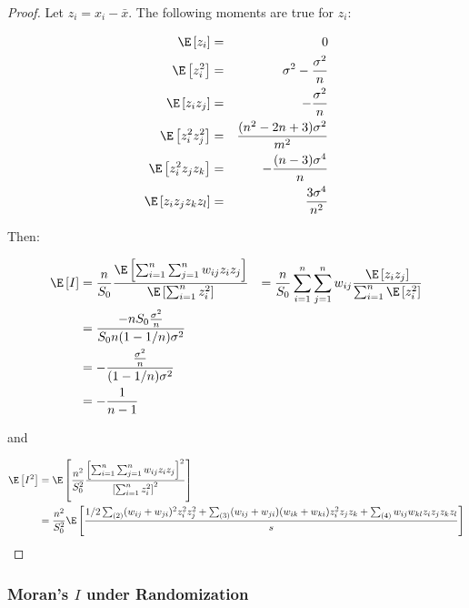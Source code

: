 \documentclass[english,12pt]{book}\usepackage[]{graphicx}\usepackage[]{xcolor}
\begin{document}
\begin{proof}
Let $z_i=x_i - \bar{x}$. The following moments are true for $z_i$:

\begin{eqnarray*}
\E\left[z_i\right]   & = & 0 \\
\E\left[z_i^2\right] & = & \sigma^2 - \frac{\sigma^2}{n} \\
\E\left[z_iz_j\right] & = & - \frac{\sigma^2}{n} \\
\E\left[z_i^2 z_j^2\right] & = & \frac{(n^2 - 2n + 3)\sigma^2}{m^2} \\
\E\left[z_i^2 z_jz_k\right] & = & - \frac{(n -3)\sigma^4}{n} \\
\E\left[z_iz_jz_kz_l\right] & = & \frac{3 \sigma^4}{n^2}
\end{eqnarray*}


Then:

\begin{equation}
  \begin{aligned}
    \E\left[I\right] & = \frac{n}{S_0}\frac{\E\left[\sum_{i = 1}^n\sum_{j=1}^nw_{ij}z_iz_j\right]}{\E\left[\sum_{i=1}^nz_i^2\right]}
    & = \frac{n}{S_0}\sum_{i = 1}^n\sum_{j=1}^nw_{ij}\frac{\E\left[z_iz_j\right]}{\sum_{i=1}^n\E\left[z_i^2\right]} \\
    & = \frac{-nS_0\frac{\sigma^2}{n}}{S_0 n (1 - 1/n)\sigma^2 } \\
    & = -\frac{\frac{\sigma^2}{n}}{(1 - 1/n)\sigma^2 } \\
    & = -\frac{1}{n - 1} 
  \end{aligned}
\end{equation}

and

\begin{equation}
  \begin{aligned}
    \E\left[I^2\right] & = \E\left[\frac{n^2}{S_0^2}\frac{\left[\sum_{i = 1}^n\sum_{j=1}^nw_{ij}z_iz_j\right]^2}{\left[\sum_{i=1}^nz_i^2\right]^2}\right] \\
    & = \frac{n^2}{S_0^2} \E\left[\frac{1/2\sum_{(2)}(w_{ij} + w_{ji})^2 z_i^2 z_j^2 + \sum_{(3)}(w_{ij} + w_{ji})(w_{ik} + w_{ki})z_i^2z_jz_k + \sum_{(4)} w_{ij}w_{kl}z_iz_jz_kz_l}{s}\right]
  \end{aligned}
\end{equation}
\end{proof}

\subsubsection{Moran's $I$ under Randomization}
\end{document}
